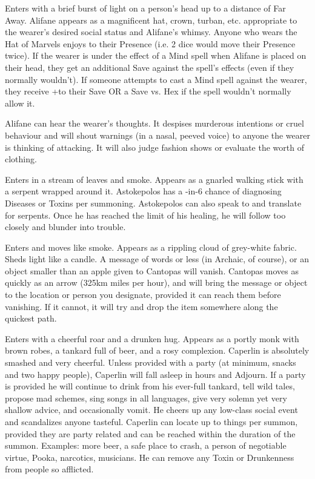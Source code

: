 {
Enters with a brief burst of light on a person's head up to a distance of Far Away.  Alifane appears as a magnificent hat, crown, turban, etc. appropriate to the wearer's desired social status and Alifane's whimsy.  Anyone who wears the Hat of Marvels enjoys \DICE \DCUP to their Presence (i.e. 2 dice would move their Presence \DCUP twice).  If the wearer is under the effect of a Mind spell when Alifane is placed on their head, they get an additional Save against the spell's effects (even if they normally wouldn't).  If someone attempts to cast a Mind spell against the wearer, they receive +\DICE to their Save OR a Save vs. Hex if the spell wouldn't normally allow it.

Alifane can hear the wearer's thoughts. It despises murderous intentions or cruel behaviour and will shout warnings (in a nasal, peeved voice) to anyone the wearer is thinking of attacking. It will also judge fashion shows or evaluate the worth of clothing.


Enters in a stream of leaves and smoke. Appears as a gnarled walking stick with a serpent wrapped around it. Astokepolos has a \DICE-in-6 chance of diagnosing \DICE Diseases or Toxins per summoning.  Astokepolos can also speak to and translate for serpents. Once he has reached the limit of his healing, he will follow too closely and blunder into trouble.


Enters and moves like smoke. Appears as a rippling cloud of grey-white fabric. Sheds light like a candle. A message of \SUMDICE words or less (in Archaic, of course), or an object smaller than an apple given to Cantopas will vanish. Cantopas moves as quickly as an arrow (325km miles per hour), and will bring the message or object to the location or person you designate, provided it can reach them before vanishing. If it cannot, it will try and drop the item somewhere along the quickest path. 



Enters with a cheerful roar and a drunken hug. Appears as a portly monk with brown robes, a tankard full of beer, and a rosy complexion. Caperlin is absolutely smashed and very cheerful. Unless provided with a party (at minimum, snacks and two happy people), Caperlin will fall asleep in \DICE hours and Adjourn. If a party is provided he will continue to drink from his ever-full tankard, tell wild tales, propose mad schemes, sing songs in all languages, give very solemn yet very shallow advice, and occasionally vomit. He cheers up any low-class social event and scandalizes anyone tasteful. Caperlin can locate up to \DICE things per summon, provided they are party related and can be reached within the duration of the summon. Examples: more beer, a safe place to crash, a person of negotiable virtue, Pooka, narcotics, musicians.  He can remove any Toxin or Drunkenness from \DICE people so afflicted.




}
